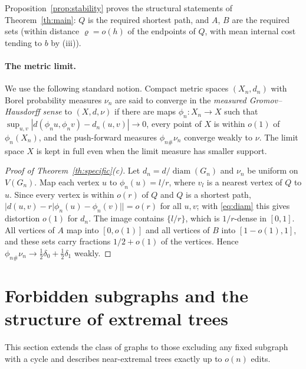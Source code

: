 \documentclass[11pt,a4paper]{article}
\theoremstyle{definition}
\newcommand{\diam}{\operatorname{diam}}
\begin{document}
Proposition~\ref{prop:stability} proves the structural statements of Theorem~\ref{th:main}: $Q$ is the required shortest path, and $A$, $B$ are the required sets (within distance $\varrho=o(h)$ of the endpoints of $Q$, with mean internal cost tending to $b$ by (iii)).

\paragraph{The metric limit.}
We use the following standard notion. Compact metric spaces $(X_n,d_n)$ with Borel probability measures $\nu_n$ are said to converge in the \emph{measured Gromov--Hausdorff sense} to $(X,d,\nu)$ if there are maps $\phi_n:X_n\to X$ such that $\sup_{u,v}|d(\phi_n u,\phi_n v)-d_n(u,v)|\to0$, every point of $X$ is within $o(1)$ of $\phi_n(X_n)$, and the push-forward measures $\phi_{n\#}\nu_n$ converge weakly to $\nu$. The limit space $X$ is kept in full even when the limit measure has smaller support.

\begin{proof}[Proof of Theorem~\ref{th:specific}(c)]
Let $d_n=d/\diam(G_n)$ and $\nu_n$ be uniform on $V(G_n)$. Map each vertex $u$ to $\phi_n(u)=l/r$, where $v_l$ is a nearest vertex of $Q$ to $u$. Since every vertex is within $o(r)$ of $Q$ and $Q$ is a shortest path, $|d(u,v)-r|\phi_n(u)-\phi_n(v)||=o(r)$ for all $u,v$; with \eqref{eq:diam} this gives distortion $o(1)$ for $d_n$. The image contains $\{l/r\}$, which is $1/r$-dense in $[0,1]$. All vertices of $A$ map into $[0,o(1)]$ and all vertices of $B$ into $[1-o(1),1]$, and these sets carry fractions $1/2+o(1)$ of the vertices. Hence $\phi_{n\#}\nu_n\to\frac12\delta_0+\frac12\delta_1$ weakly.
\end{proof}

\section{Forbidden subgraphs and the structure of extremal trees}\label{sec:forbidden}
This section extends the class of graphs to those excluding any fixed subgraph with a cycle and describes near-extremal trees exactly up to $o(n)$ edits.
\end{document}
